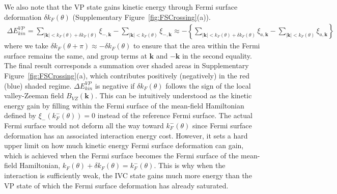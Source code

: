 \documentclass[aps,pra,twocolumn,superscriptaddress,10pt,article,nofootinbib,showpacs,longbibliography]{revtex4-1}
\def \k{{\mathbf k}}
\begin{document}
We also note that the VP state gains kinetic energy through Fermi surface deformation $\delta k_F(\theta)$ (Supplementary Figure~\ref{fig:FSCrossing}(a)). 
\begin{align}
    \Delta E_{kin}^{VP} = \sum_{|\k| < k_F(
    \theta) +\delta k_F(
    \theta)} \xi_{-,\k} - \sum_{|\k| < k_F(
    \theta)} \xi_{-,\k}\approx - \left \{ \sum_{|\k| < k_F(
    \theta) +\delta k_F(
    \theta)} \xi_{a,\k} - \sum_{|\k| < k_F(
    \theta)} \xi_{a,\k} \right \}
\end{align}
where we take $\delta k_F(\theta + \pi) \approx - \delta k_F(\theta)$ to ensure that the area within the Fermi surface remains the same, and group terms at $\k$ and $-\k$ in the second equality. The final result corresponds a summation over shaded areas in Supplementary Figure~\ref{fig:FSCrossing}(a), which contributes positively (negatively) in the red (blue) shaded regime. $\Delta E_{kin}^{VP}$ is negative if $\delta k_F(\theta)$ follows the sign of the local valley-Zeeman field $B_{VZ}(\k)$. This can be intuitively understood as the kinetic energy gain by filling within the Fermi surface of the mean-field Hamiltonian defined by $\xi_{-}(k_F^{-}(\theta)) = 0$ instead of the reference Fermi surface. The actual Fermi surface would not deform all the way toward $k_F^{-}(\theta)$ since Fermi surface deformation has an associated interaction energy cost. However, it sets a hard upper limit on how much kinetic energy Fermi surface deformation can gain, which is achieved when the Fermi surface becomes the Fermi surface of the mean-field Hamiltonian, $k_F(\theta)   +\delta k_F(\theta) = k_F^{-}(\theta)$. This is why when the interaction is sufficiently weak, the IVC state gains much more energy than the VP state of which the Fermi surface deformation has already saturated.
\end{document}
